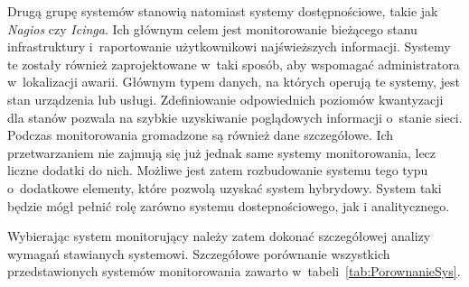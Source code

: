 Drugą grupę systemów stanowią natomiast systemy dostępnościowe, takie
jak {\em Nagios} czy {\em Icinga}. Ich głównym celem jest monitorowanie bieżącego
stanu infrastruktury i~raportowanie użytkownikowi najświeższych
informacji. Systemy te zostały również zaprojektowane w~taki sposób,
aby wspomagać administratora w~lokalizacji awarii. Głównym typem
danych, na których operują te systemy, jest stan urządzenia lub
usługi. Zdefiniowanie odpowiednich poziomów kwantyzacji dla stanów
pozwala na szybkie uzyskiwanie poglądowych informacji o~stanie
sieci. Podczas monitorowania gromadzone są również dane
szczegółowe. Ich przetwarzaniem nie zajmują się już jednak same
systemy monitorowania, lecz liczne dodatki do nich. Możliwe jest zatem
rozbudowanie systemu tego typu o~dodatkowe elementy, które pozwolą
uzyskać system hybrydowy. System taki będzie mógł pełnić rolę zarówno
systemu dostepnościowego, jak i analitycznego.

Wybierając system monitorujący należy zatem dokonać szczegółowej
analizy wymagań stawianych systemowi. Szczegółowe porównanie
wszystkich przedstawionych systemów monitorowania zawarto
w~tabeli~\ref{tab:PorownanieSys}.

